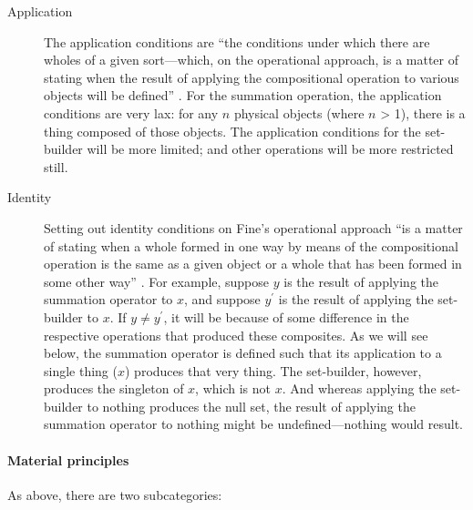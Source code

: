 \documentclass[11pt]{article}
\begin{document}
\begin{spacing}{1.25}
\begin{description}
  \item[Application] The application conditions are ``the conditions
    under which there are wholes of a given sort---which, on the
    operational approach, is a matter of stating when the result of
    applying the compositional operation to various objects will be
    defined'' \citep[570]{fine2010}.  For the summation operation, the
    application conditions are very lax: for any $n$ physical objects
    (where $n$ \textgreater{} 1), there is a thing composed of those
    objects.  The application conditions for the set-builder will be
    more limited; and other operations will be more restricted
    still. \label{fine-app}
  \item[Identity] Setting out identity conditions on Fine's
    operational approach ``is a matter of stating when a whole formed
    in one way by means of the compositional operation is the same as
    a given object or a whole that has been formed in some other way''
    \citeyearpar[570]{fine2010}.  For example, suppose $y$ is the
    result of applying the summation operator to $x$, and suppose
    $y^\prime$ is the result of applying the set-builder to $x$.  If
    $y \neq y^\prime$, it will be because of some difference in the
    respective operations that produced these composites.  As we will
    see below, the summation operator is defined such that its
    application to a single thing ($x$) produces that very thing.  The
    set-builder, however, produces the singleton of $x$, which is not
    $x$.  And whereas applying the set-builder to nothing produces the
    null set, the result of applying the summation operator to nothing
    might be undefined---nothing would result.
\end{description}

\paragraph{Material principles}
As above, there are two subcategories:


\end{spacing}
\end{document}
